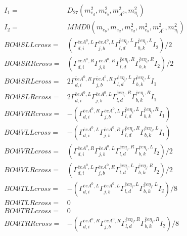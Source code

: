 \documentclass[A4,landscape]{article}
\begin{document}
\begin{align} 
I_1 = & D_{27}(m^2_{e_{{d}}}, m^2_{e_{{b}}}, m^2_{A^0}, m^2_{\eta_i}) \\ 
I_2 = & MMD0(m_{e_{{b}}}, m_{e_{{d}}}, m^2_{e_{{d}}}, m^2_{e_{{b}}}, m^2_{A^0}, m^2_{\eta_i}) \\ 
  BO4lSLLcross= & ( \Gamma^{\bar{e}e A^0 ,L}_{d, i} \Gamma^{\bar{e}e A^0 ,L}_{j, b} \Gamma^{\bar{e}e \eta_i ,L}_{l, d} \Gamma^{\bar{e}e \eta_i ,L}_{b, k} I_2)/2 \\ 
  BO4lSRRcross= & ( \Gamma^{\bar{e}e A^0 ,R}_{d, i} \Gamma^{\bar{e}e A^0 ,R}_{j, b} \Gamma^{\bar{e}e \eta_i ,R}_{l, d} \Gamma^{\bar{e}e \eta_i ,R}_{b, k} I_2)/2 \\ 
  BO4lSRLcross= & 2  \Gamma^{\bar{e}e A^0 ,R}_{d, i} \Gamma^{\bar{e}e A^0 ,R}_{j, b} \Gamma^{\bar{e}e \eta_i ,L}_{l, d} \Gamma^{\bar{e}e \eta_i ,L}_{b, k} I_1 \\ 
  BO4lSLRcross= & 2  \Gamma^{\bar{e}e A^0 ,L}_{d, i} \Gamma^{\bar{e}e A^0 ,L}_{j, b} \Gamma^{\bar{e}e \eta_i ,R}_{l, d} \Gamma^{\bar{e}e \eta_i ,R}_{b, k} I_1 \\ 
  BO4lVRRcross= & -( \Gamma^{\bar{e}e A^0 ,R}_{d, i} \Gamma^{\bar{e}e A^0 ,L}_{j, b} \Gamma^{\bar{e}e \eta_i ,L}_{l, d} \Gamma^{\bar{e}e \eta_i ,R}_{b, k} I_1) \\ 
  BO4lVLLcross= & -( \Gamma^{\bar{e}e A^0 ,L}_{d, i} \Gamma^{\bar{e}e A^0 ,R}_{j, b} \Gamma^{\bar{e}e \eta_i ,R}_{l, d} \Gamma^{\bar{e}e \eta_i ,L}_{b, k} I_1) \\ 
  BO4lVRLcross= & ( \Gamma^{\bar{e}e A^0 ,R}_{d, i} \Gamma^{\bar{e}e A^0 ,L}_{j, b} \Gamma^{\bar{e}e \eta_i ,R}_{l, d} \Gamma^{\bar{e}e \eta_i ,L}_{b, k} I_2)/2 \\ 
  BO4lVLRcross= & ( \Gamma^{\bar{e}e A^0 ,L}_{d, i} \Gamma^{\bar{e}e A^0 ,R}_{j, b} \Gamma^{\bar{e}e \eta_i ,L}_{l, d} \Gamma^{\bar{e}e \eta_i ,R}_{b, k} I_2)/2 \\ 
  BO4lTLLcross= & -( \Gamma^{\bar{e}e A^0 ,L}_{d, i} \Gamma^{\bar{e}e A^0 ,L}_{j, b} \Gamma^{\bar{e}e \eta_i ,L}_{l, d} \Gamma^{\bar{e}e \eta_i ,L}_{b, k} I_2)/8 \\ 
  BO4lTLRcross= & 0 \\ 
  BO4lTRLcross= & 0 \\ 
  BO4lTRRcross= & -( \Gamma^{\bar{e}e A^0 ,R}_{d, i} \Gamma^{\bar{e}e A^0 ,R}_{j, b} \Gamma^{\bar{e}e \eta_i ,R}_{l, d} \Gamma^{\bar{e}e \eta_i ,R}_{b, k} I_2)/8 \\ 
\end{align} 
\end{document}
